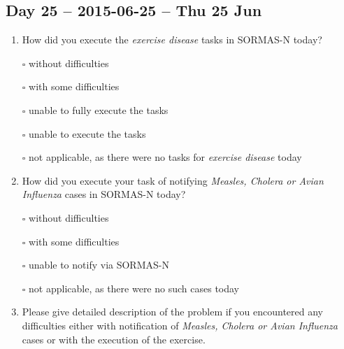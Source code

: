 \documentclass[a4paper, titlepage]{tufte-handout}
\begin{document}
\subsection{Day 25 -- 2015-06-25 -- Thu 25 Jun}
\label{sec-8-19}
\begin{enumerate}
\item How did you execute the \emph{exercise disease} tasks in SORMAS-N today?

\quad $\square$ without difficulties

\quad $\square$ with some difficulties

\quad $\square$ unable to fully execute the tasks

\quad $\square$ unable to execute the tasks

\quad $\square$ not applicable, as there were no tasks for \emph{exercise disease} today

\item How did you execute your task of notifying \emph{Measles, Cholera or Avian Influenza} cases in SORMAS-N today?

\quad $\square$ without difficulties

\quad $\square$ with some difficulties

\quad $\square$ unable to notify via SORMAS-N

\quad $\square$ not applicable, as there were no such cases today

\item Please give detailed description of the problem if you encountered any difficulties either with notification of \emph{Measles, Cholera or Avian Influenza} cases or with the execution of the exercise.

\hrulefill

\hrulefill

\hrulefill

\hrulefill

\hrulefill

\hrulefill

\hrulefill

\hrulefill

\hrulefill

\hrulefill
\end{enumerate}

\newpage
\end{document}
